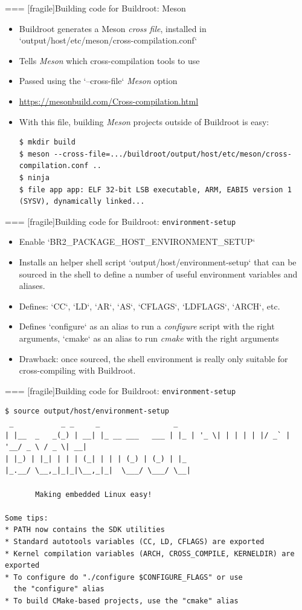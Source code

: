 === [fragile]{Building code for Buildroot: Meson}
  \begin{itemize}
  \item Buildroot generates a Meson {\em cross file}, installed in
    `output/host/etc/meson/cross-compilation.conf`
  \item Tells {\em Meson} which cross-compilation tools to use
  \item Passed using the `--cross-file` {\em Meson} option
  \item \url{https://mesonbuild.com/Cross-compilation.html}
  \item With this file, building {\em Meson} projects outside of
    Buildroot is easy:
    \begin{block}{}
{\scriptsize
\begin{verbatim}
$ mkdir build
$ meson --cross-file=.../buildroot/output/host/etc/meson/cross-compilation.conf ..
$ ninja
$ file app app: ELF 32-bit LSB executable, ARM, EABI5 version 1 (SYSV), dynamically linked...
\end{verbatim}}
\end{block}
\end{itemize}


=== [fragile]{Building code for Buildroot: {\tt environment-setup}}
  \begin{itemize}
  \item Enable `BR2_PACKAGE_HOST_ENVIRONMENT_SETUP`
  \item Installs an helper shell script
    `output/host/environment-setup` that can be sourced in the
    shell to define a number of useful environment variables and
    aliases.
  \item Defines: `CC`, `LD`, `AR`, `AS`,
    `CFLAGS`, `LDFLAGS`, `ARCH`, etc.
  \item Defines `configure` as an alias to run a {\em configure}
    script with the right arguments, `cmake` as an alias to run
    {\em cmake} with the right arguments
  \item Drawback: once sourced, the shell environment is really only
    suitable for cross-compiling with Buildroot.
  \end{itemize}


=== [fragile]{Building code for Buildroot: {\tt environment-setup}}
  \begin{block}{}
  {\tiny
\begin{verbatim}
$ source output/host/environment-setup 
 _           _ _     _                 _
| |__  _   _(_) | __| |_ __ ___   ___ | |_ | '_ \| | | | | |/ _` | '__/ _ \ / _ \| __|
| |_) | |_| | | | (_| | | | (_) | (_) | |_
|_.__/ \__,_|_|_|\__,_|_|  \___/ \___/ \__|

       Making embedded Linux easy!

Some tips:
* PATH now contains the SDK utilities
* Standard autotools variables (CC, LD, CFLAGS) are exported
* Kernel compilation variables (ARCH, CROSS_COMPILE, KERNELDIR) are exported
* To configure do "./configure $CONFIGURE_FLAGS" or use
  the "configure" alias
* To build CMake-based projects, use the "cmake" alias
\end{verbatim}
  }
\end{block}

